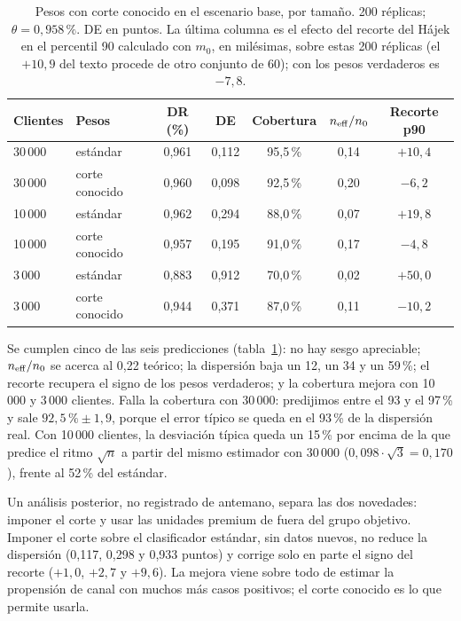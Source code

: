 \begin{table}[ht]
\centering\small
\caption{Pesos con corte conocido en el escenario base, por tamaño. 200 réplicas; $\theta=0,958\,\%$. DE en puntos. La última columna es el efecto del recorte del Hájek en el percentil 90 calculado con $m_0$, en milésimas, sobre estas 200 réplicas (el $+10,9$ del texto procede de otro conjunto de 60); con los pesos verdaderos es $-7,8$.}\label{tab:corte}
\begin{tabular}{@{}llccccc@{}}
\toprule
Clientes & Pesos & DR (\%) & DE & Cobertura & $n_{\mathrm{eff}}/n_0$ & Recorte p90 \\
\midrule
30\,000 & estándar & 0,961 & 0,112 & 95,5\,\% & 0,14 & $+10,4$ \\
30\,000 & corte conocido & 0,960 & 0,098 & 92,5\,\% & 0,20 & $-6,2$ \\
10\,000 & estándar & 0,962 & 0,294 & 88,0\,\% & 0,07 & $+19,8$ \\
10\,000 & corte conocido & 0,957 & 0,195 & 91,0\,\% & 0,17 & $-4,8$ \\
3\,000 & estándar & 0,883 & 0,912 & 70,0\,\% & 0,02 & $+50,0$ \\
3\,000 & corte conocido & 0,944 & 0,371 & 87,0\,\% & 0,11 & $-10,2$ \\
\bottomrule
\end{tabular}
\end{table}

Se cumplen cinco de las seis predicciones (tabla~\ref{tab:corte}): no hay sesgo apreciable; $n_{\mathrm{eff}}/n_0$ se acerca al 0,22 teórico; la dispersión baja un 12, un 34 y un 59\,\%; el recorte recupera el signo de los pesos verdaderos; y la cobertura mejora con 10\,000 y 3\,000 clientes. Falla la cobertura con 30\,000: predijimos entre el 93 y el 97\,\% y sale $92,5\,\%\pm1,9$, porque el error típico se queda en el 93\,\% de la dispersión real. Con 10\,000 clientes, la desviación típica queda un 15\,\% por encima de la que predice el ritmo $\sqrt n$ a partir del mismo estimador con 30\,000 ($0,098\cdot\sqrt3=0,170$), frente al 52\,\% del estándar.

Un análisis posterior, no registrado de antemano, separa las dos novedades: imponer el corte y usar las unidades premium de fuera del grupo objetivo. Imponer el corte sobre el clasificador estándar, sin datos nuevos, no reduce la dispersión (0,117, 0,298 y 0,933 puntos) y corrige solo en parte el signo del recorte ($+1,0$, $+2,7$ y $+9,6$). La mejora viene sobre todo de estimar la propensión de canal con muchos más casos positivos; el corte conocido es lo que permite usarla.

